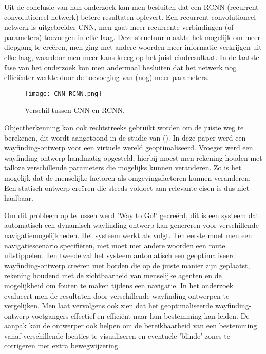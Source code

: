 Uit de conclusie van hun onderzoek kan men besluiten dat een RCNN (recurrent convolutioneel netwerk) betere resultaten oplevert. Een recurrent convolutioneel netwerk is uitgebreider CNN, men gaat meer recurrente verbindingen (of parameters) toevoegen in elke laag. Deze structuur maakte het mogelijk om meer diepgang te creëren, men ging met andere woorden meer informatie verkrijgen uit elke laag, waardoor men meer kans kreeg op het juist eindresultaat. In de laatste fase van het onderzoek kon men andermaal besluiten dat het netwerk nog efficiënter werkte door de toevoeging van (nog) meer parameters.

\begin{figure}[H]
	\centering
	\texttt{[image: CNN\_RCNN.png]}
	\caption{Verschil tussen CNN en RCNN, \autocite{Liang2015}}
\end{figure}

Objectherkenning kan ook rechtstreeks gebruikt worden om de juiste weg te berekenen, dit wordt aangetoond in de studie van \textcite{Haikun2017} (). In deze paper werd een wayfinding-ontwerp voor een virtuele wereld geoptimaliseerd. Vroeger werd een wayfinding-ontwerp handmatig opgesteld, hierbij moest men rekening houden met talloze verschillende parameters die mogelijks kunnen veranderen. Zo is het mogelijk dat de menselijke factoren als omgevingsfactoren  kunnen veranderen. Een statisch ontwerp creëren die steeds voldoet aan relevante eisen is dus niet haalbaar.

Om dit probleem op te lossen werd 'Way to Go!' gecreërd, dit is een systeem dat automatisch een dynamisch wayfinding-ontwerp kan genereren voor verschillende navigatiemogelijkheden. Het systeem werkt als volgt. Ten eerste moet men een navigatiescenario specifiëren, met moet met andere woorden een route uitstippelen. Ten tweede zal het systeem automatisch een geoptimaliseerd wayfinding-ontwerp creëren met borden die op de juiste manier zijn geplaatst, rekening houdend met de zichtbaarheid van menselijke agenten en de mogelijkheid om fouten te maken tijdens een navigatie.  In het onderzoek evalueert men de resultaten door verschillende wayfinding-ontwerpen te vergelijken. Men laat vervolgens ook zien dat het geoptimaliseerde wayfinding-ontwerp voetgangers effectief en efficiënt naar hun bestemming kan leiden. De aanpak kan de ontwerper ook helpen om de bereikbaarheid van een bestemming vanaf verschillende locaties te visualiseren en eventuele 'blinde' zones te corrigeren met extra bewegwijzering.

